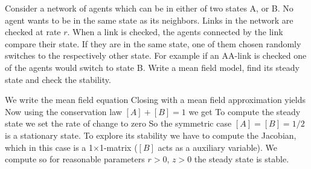 
Consider a network of agents which can be in either of two states A, or B. No agent wants to be in the same state as its neighbors. Links in the network are checked at rate $r$. When a link is checked, the agents connected by the link compare their state. If they are in the same state, one of them chosen randomly switches to the respectively other state. For example if an AA-link is checked one of the agents would switch to state B. Write a mean field model, find its steady state and check the stability. 

\solution

We write the mean field equation
Closing with a mean field approximation yields
Now using the conservation law $[A]+[B]=1$ we get 
To compute the steady state we set the rate of change to zero
So the symmetric case $[A]=[B]=1/2$ is a stationary state. To explore its stability 
we have to compute the Jacobian, which in this case is a 1$\times$1-matrix ($[B]$ acts as a 
auxiliary variable). We compute
so for reasonable parameters $r>0$, $z>0$ the steady state is stable.

